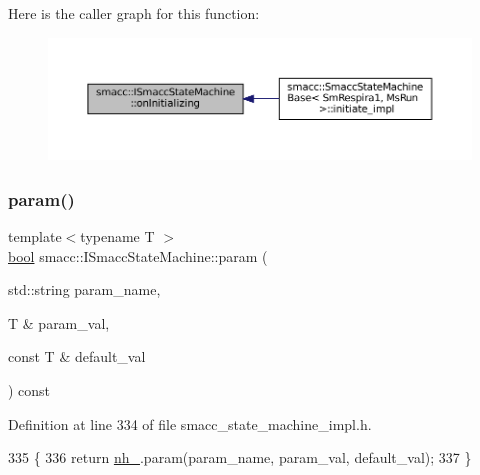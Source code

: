 Here is the caller graph for this function\+:
\nopagebreak
\begin{figure}[H]
\begin{center}
\leavevmode
\includegraphics[width=350pt]{classsmacc_1_1ISmaccStateMachine_ae8c9c79ca6cd77c975f5d9cda33a6d5e_icgraph}
\end{center}
\end{figure}
\mbox{\label{classsmacc_1_1ISmaccStateMachine_a2900ef881968af90562abfc9103570f3}} 
\subsubsection{\texorpdfstring{param()}{param()}}
{\footnotesize\ttfamily template$<$typename T $>$ \\
\hyperlink{classbool}{bool} smacc\+::\+I\+Smacc\+State\+Machine\+::param (\begin{DoxyParamCaption}\item[{std\+::string}]{param\+\_\+name,  }\item[{T \&}]{param\+\_\+val,  }\item[{const T \&}]{default\+\_\+val }\end{DoxyParamCaption}) const\hspace{0.3cm}{\ttfamily [protected]}}



Definition at line 334 of file smacc\+\_\+state\+\_\+machine\+\_\+impl.\+h.


\begin{DoxyCode}
335 \{
336     \textcolor{keywordflow}{return} \hyperlink{classsmacc_1_1ISmaccStateMachine_ad8877bcca9dbb345fe72cca839c93dd3}{nh\_}.param(param\_name, param\_val, default\_val);
337 \}
\end{DoxyCode}
\mbox{\label{classsmacc_1_1ISmaccStateMachine_ad80cdd7bbc9a9f3b221c625754fed1ed}} 
